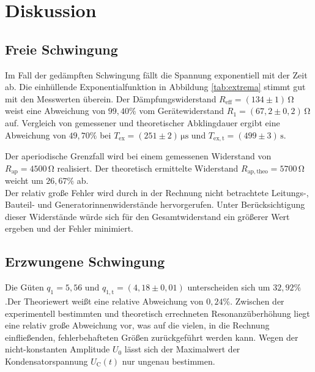 \section{Diskussion}
\label{sec:Diskussion}
\subsection{Freie Schwingung}
Im Fall der gedämpften Schwingung fällt die Spannung exponentiell mit der Zeit ab. 
Die einhüllende Exponentialfunktion in Abbildung \ref{tab:extrema} stimmt gut mit den Messwerten überein. 
Der Dämpfungswiderstand $R_\mathup{eff}=(134\pm1)\,\si{\ohm}$ weist eine Abweichung von $99,40\%$ vom Gerätewiderstand $R_1=(67,2\pm0,2)\,\si{\ohm}$ auf.
Vergleich von gemessener und theoretischer Abklingdauer ergibt eine Abweichung von $49,70\%$ bei $T_\mathup{ex}=(251\pm2)\,\si{\micro\second}$ und $T_\mathup{ex,t}=(499\pm3)\,\si\second$. 

Der aperiodische Grenzfall wird bei einem gemessenen Widerstand von $R_\mathup{ap}=4500\,\si\ohm$ realisiert. 
Der theoretisch ermittelte Widerstand $R_\mathup{ap,theo}=5700\,\si\ohm$ weicht um $26,67\%$ ab.\\
Der relativ große Fehler wird durch in der Rechnung nicht betrachtete Leitungs-, Bauteil- und Generatorinnenwiderstände hervorgerufen. 
Unter Berücksichtigung dieser Widerstände würde sich für den Gesamtwiderstand ein größerer Wert ergeben und der Fehler minimiert.

\subsection{Erzwungene Schwingung}
Die Güten $q_1=5,56$ und $q_{1,\mathup{t}}=(4,18\pm0,01)$ unterscheiden sich um $32,92\%$.Der Theoriewert weißt eine relative Abweichung von $0,24\%$.
Zwischen der experimentell bestimmten und theoretisch errechneten Resonanzüberhöhung liegt eine relativ große Abweichung vor, was auf die vielen, in die Rechnung einfließenden, fehlerbehafteten Größen zurückgeführt werden kann. 
Wegen der nicht-konstanten Amplitude $U_0$ lässt sich der Maximalwert der Kondensatorspannung $U_\mathup{C}(t)$ nur ungenau bestimmen. 

